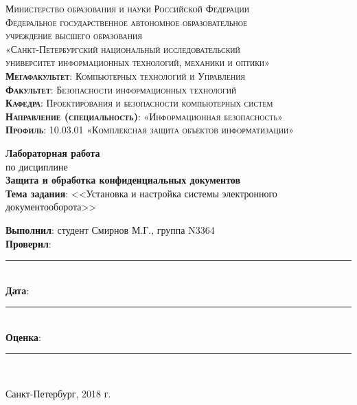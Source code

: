 \begin{titlepage}
	\begin{center}
		\textsc{
			\fontsize{12pt}{14pt}\selectfont
			Министерство образования и науки Российской Федерации\\
			Федеральное государственное автономное образовательное\\
			учреждение высшего образования\\
			«Санкт-Петербургский национальный исследовательский\\
			университет информационных технологий, механики и оптики»\\
			\textbf{Мегафакультет}:  Компьютерных технологий и Управления\\
			\textbf{Факультет}: Безопасности информационных технологий\\
			\textbf{Кафедра}: Проектирования и безопасности компьютерных систем\\
			\textbf{Направление (специальность)}: «Информационная безопасность»\\
			\textbf{Профиль}: 10.03.01 «Комплексная защита объектов информатизации»}
		
		\vfill
		
		\textbf{Лабораторная работа}\\
		по дисциплине\\
		\textbf{Защита и обработка конфиденциальных документов}\\
	\vfill
	\textbf{Тема задания}: <<Установка и настройка системы электронного документооборота>>\\
	\end{center}

	\vfill
	
	\begin{flushright}
	\textbf{Выполнил}: студент Смирнов М.Г., группа N3364\\
	\textbf{Проверил}: \rule{10em}{.1pt}\\
		\vfill
	\textbf{Дата}: \rule{10em}{.1pt}\\
	\textbf{Оценка}: \rule{10em}{.1pt}\\

	\vfill
	


	\end{flushright}
	\vfill
	\begin{center}
		Санкт-Петербург, 2018 г.
	\end{center}
\end{titlepage}